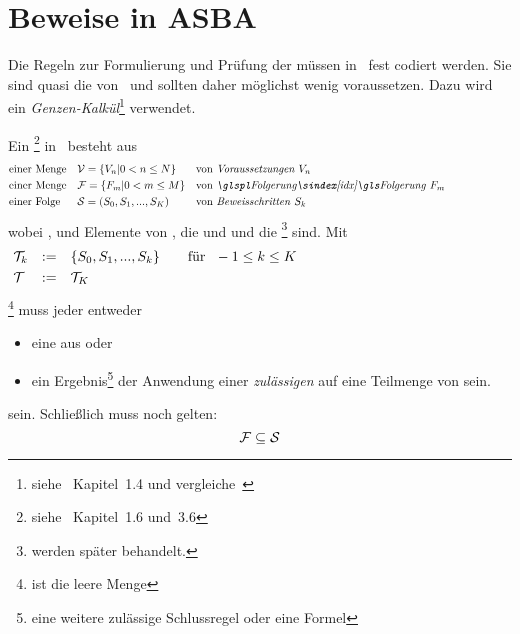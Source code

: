 \section{Beweise in ASBA}%
\label{sec:BeweiseASBA}

Die Regeln zur Formulierung und Prüfung der  müssen in \ASBA\ fest codiert werden.
Sie sind quasi die  von \ASBA\ und sollten daher möglichst wenig voraussetzen.
Dazu wird ein \emph{Genzen-Kalkül}\footnote{%
	siehe~\cite{bib:Rautenberg} Kapitel~1.4 und vergleiche~\cite{bib:Schlussregel,bib:NatuerlichesSchliessen}%
} verwendet.

Ein \footnote{%
	siehe~\cite{bib:Rautenberg} Kapitel~1.6 und~3.6%
} in \ASBA\ besteht aus
\begin{align}
	& \text{einer Menge} && \Voraussetzungen = \{\Voraussetzung_n | 0 < n \le N \}
	&& \text{von \emph{Voraussetzungen} } \Voraussetzung_n
	\label{def:Voraussetzungen}
	\\
	& \text{einer Menge} && \Folgerungen = \{\Folgerung_m | 0 < m \le M  \}
	&& \text{von \emph{\glsIdxPl{Folgerung}} } \Folgerung_m
	\label{def:Folgerungen}
	\\
	& \text{einer Folge} && \Beweisschritte = (\Beweisschritt_0, \Beweisschritt_1, ..., \Beweisschritt_K)
	&& \text{von \emph{Beweisschritten} } \Beweisschritt_k
	\label{def:Beweisfolge}
	\formulatoleft
\end{align}
wobei ,  und  Elemente von \objqt{\gsNo}, die  und   und die  \emph{}\footnote{%
	 werden später behandelt.%
} sind. Mit
\begin{align}
	& \mathcal{T}_k & \operatorname{:\!\operatorname{=}} \quad & \{S_0, S_1, ..., S_k\} & \quad \text{für~~} -1 \le k \le K
	\label{def:Beweisschrittebis} \\
	& \mathcal{T}   & \operatorname{:\!\operatorname{=}} \quad & \mathcal{T}_K \label{def:Beweisschrittmenge}
	&&&&&&&&&&&&&&&&&&&&&&&&&&&&&&
\end{align}\footnote{ ist die leere Menge \objqt{\emptyset}}
muss jeder   entweder

\begin{itemize}
	\item[] eine  aus \objqt{\Voraussetzungen} oder
	\item[] ein Ergebnis\footnote{eine weitere zulässige Schlussregel oder eine Formel} der Anwendung einer \emph{zulässigen } auf eine Teilmenge von  sein.
\end{itemize}
sein.
Schließlich muss noch gelten:
\[
	\mathcal{F} \subseteq \mathcal{S}
\]

